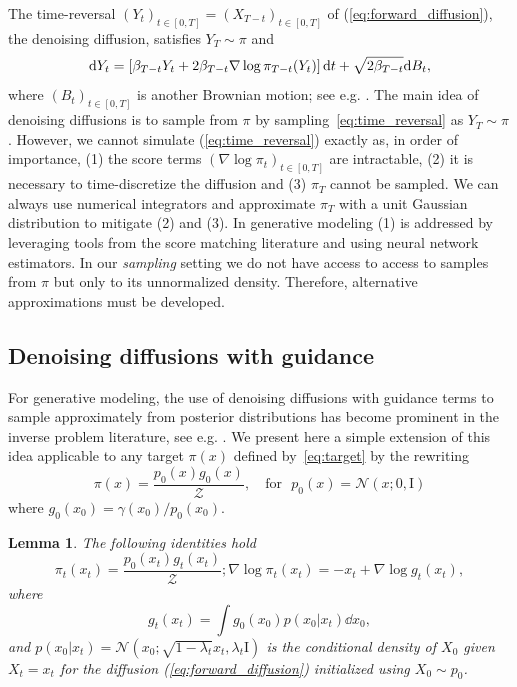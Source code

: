 \documentclass{article}
\theoremstyle{plain}
\newtheorem{lemma}[theorem]{Lemma}
\theoremstyle{definition}
\theoremstyle{remark}
\begin{document}
The time-reversal  $(Y_t)_{t\in [0,T]}=(X_{T-t})_{t\in[0,T]}$ of (\ref{eq:forward_diffusion}), the denoising diffusion, satisfies $Y_T \sim \pi$ and
\begin{equation}\label{eq:time_reversal}
	\dd Y_t = \left[ \beta_{T-t} Y_t + 2\beta_{T-t} \nabla\log \pi_{T-t}(Y_t) \right] \dd t +\sqrt{2\beta_{T-t}}\dd B_t ,
\end{equation}
where $(B_t)_{t\in [0,T]}$ is another Brownian motion; see e.g. \citet{haussmann1986time,cattiaux2021time}. The main idea of denoising diffusions is to sample from $\pi$ by sampling~\eqref{eq:time_reversal} as $Y_T \sim \pi$ \citep{ho2020denoising,song2020score}. However, we cannot simulate (\ref{eq:time_reversal}) exactly as, in order of importance, (1) the score terms $(\nabla \log \pi_t)_{t\in [0,T]}$ are intractable,  (2) it is necessary to time-discretize the diffusion and (3) $\pi_T$ cannot be sampled. We can always use numerical integrators and approximate $\pi_T$ with a unit Gaussian distribution to mitigate (2) and (3). In generative modeling (1) is addressed by leveraging tools from the score matching literature \cite{vincent2011connection,Hyvarinen:2005a} and using neural network estimators. In our \emph{sampling} setting we do not have access to access to samples from $\pi$ but only to its unnormalized density. Therefore, alternative approximations must be developed.


\subsection{Denoising diffusions with guidance}
\label{sec:guidance}
For generative modeling, the use of denoising diffusions with guidance terms to sample approximately from posterior distributions has become prominent in the inverse problem literature, see e.g. \citet{song2020score,chung2023diffusion,song2023pseudoinverseguided,corso2023particle}. We present here a simple extension of this idea applicable to any target $\pi(x)$ defined by~\eqref{eq:target} by the rewriting
\begin{equation}
	\label{eq:def_g0}
	\pi(x) = \frac{p_0(x) g_0(x)}{\mathcal Z}, \quad\text{for~~} p_0(x)=\mathcal{N}(x;0,\mathrm{I})
\end{equation}
where $g_0(x_0) = \gamma(x_0)/p_0(x_0)$.
\begin{lemma}\label{lemma:score}
	The following identities hold
	\begin{equation}\label{eq:twisted_densityandgrad_guidance}
		\pi_t(x_t) = \frac{p_0(x_t) g_t(x_t)}{\mathcal Z}; 	\nabla \log \pi_t(x_t) = -x_t+ \nabla \log g_t(x_t) ,
	\end{equation}
	where
	\begin{equation}
		\textstyle \label{eq:scorepotential}
		g_t(x_t)=\int g_0(x_0)p(x_0|x_t) \dd x_0 ,
	\end{equation}
	and  $p(x_0|x_t)=\mathcal{N}(x_0;\sqrt{1-\lambda_t}x_t,\lambda_t \mathrm{I})$ is the conditional density of $X_0$ given $X_t=x_t$ for the diffusion (\ref{eq:forward_diffusion}) initialized using $X_0\sim p_0$.
\end{lemma}
\end{document}
